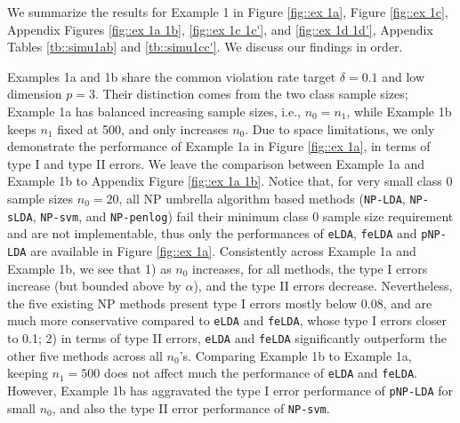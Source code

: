 \documentclass[12pt]{article}
\numberwithin{equation}{section}
\theoremstyle{remark}
\newcommand{\1}{{\rm 1}\kern-0.24em{\rm I}}
\begin{document}
We summarize the results for Example 1 in Figure \ref{fig::ex 1a},  Figure \ref{fig::ex 1c},  Appendix Figures \ref{fig::ex 1a 1b},  \ref{fig::ex 1c 1c'}, and \ref{fig::ex 1d 1d'},  Appendix Tables \ref{tb::simu1ab} and \ref{tb::simu1cc'}.  We discuss our findings in order.

Examples 1a and 1b share the common violation rate target $\delta=0.1$ and low dimension $p=3$. Their distinction comes from the two class sample sizes; Example 1a has balanced increasing sample sizes, i.e., $n_0=n_1$,  while Example 1b keeps $n_1$ fixed at 500, and only increases $n_0$.  Due to space limitations,  we only demonstrate the performance of Example 1a in Figure \ref{fig::ex 1a},  in terms of type I and type II errors.  We leave the comparison between Example 1a and Example 1b to Appendix Figure \ref{fig::ex 1a 1b}.  Notice that,  for very small class 0 sample sizes $n_0 = 20$,  all NP umbrella algorithm based methods (\verb+NP-LDA+, \verb+NP-sLDA+, \verb+NP-svm+, and \verb+NP-penlog+) fail their minimum class 0 sample size requirement and are not implementable, thus only the performances of \verb+eLDA+, \verb+feLDA+ and \verb+pNP-LDA+ are available in Figure \ref{fig::ex 1a}.  Consistently across Example 1a and Example 1b, we see that 1) as $n_0$ increases,  for all methods, the type I errors increase (but bounded above by $\alpha$), and the type II errors decrease.  Nevertheless,  the five existing NP methods present type I errors mostly below 0.08,  and are much more conservative compared to \verb+eLDA+ and \verb+feLDA+, whose type I errors closer to 0.1;  2) in terms of type II errors, \verb+eLDA+ and \verb+feLDA+ significantly outperform the other five methods across all $n_0$'s.   Comparing Example 1b to Example 1a,  keeping $n_1=500$ does not affect much the performance of \verb+eLDA+ and \verb+feLDA+.  However, Example 1b has aggravated the type I error performance of \verb+pNP-LDA+ for small $n_0$,  and also the type II error performance of \verb+NP-svm+.   
\end{document}
